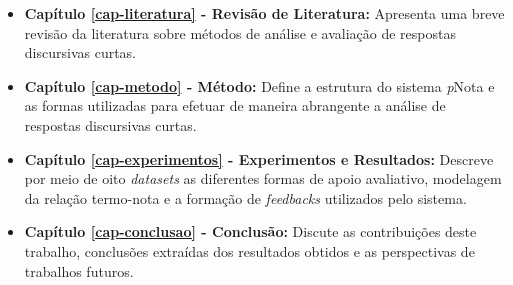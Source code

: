 \begin{itemize}
\item \textbf{Capítulo \ref{cap-literatura} - Revisão de Literatura:} Apresenta uma breve revisão da literatura sobre métodos de análise e avaliação de respostas discursivas curtas.

\item \textbf{Capítulo \ref{cap-metodo} - Método:} Define a estrutura do sistema \textit{p}Nota e as formas utilizadas para efetuar de maneira abrangente a análise de respostas discursivas curtas.

\item \textbf{Capítulo \ref{cap-experimentos} - Experimentos e Resultados:} Descreve por meio de oito \textit{datasets} as diferentes formas de apoio avaliativo, modelagem da relação termo-nota e a formação de \textit{feedbacks} utilizados pelo sistema.

\item \textbf{Capítulo \ref{cap-conclusao} - Conclusão:} Discute as contribuições deste trabalho, conclusões extraídas dos resultados obtidos e as perspectivas de trabalhos futuros.

\end{itemize}